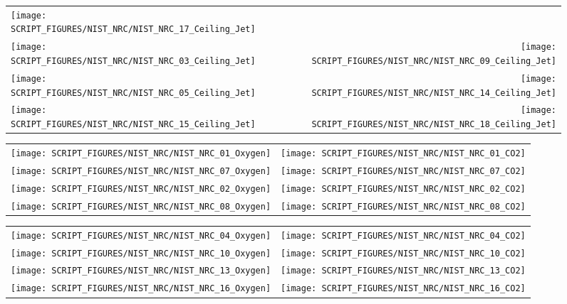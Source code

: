 \begin{figure}[p]
\begin{tabular*}{\textwidth}{l@{\extracolsep{\fill}}r}
\texttt{[image: SCRIPT\_FIGURES/NIST\_NRC/NIST\_NRC\_17\_Ceiling\_Jet]} &
 \\
\texttt{[image: SCRIPT\_FIGURES/NIST\_NRC/NIST\_NRC\_03\_Ceiling\_Jet]} &
\texttt{[image: SCRIPT\_FIGURES/NIST\_NRC/NIST\_NRC\_09\_Ceiling\_Jet]} \\
\texttt{[image: SCRIPT\_FIGURES/NIST\_NRC/NIST\_NRC\_05\_Ceiling\_Jet]} &
\texttt{[image: SCRIPT\_FIGURES/NIST\_NRC/NIST\_NRC\_14\_Ceiling\_Jet]} \\
\texttt{[image: SCRIPT\_FIGURES/NIST\_NRC/NIST\_NRC\_15\_Ceiling\_Jet]} &
\texttt{[image: SCRIPT\_FIGURES/NIST\_NRC/NIST\_NRC\_18\_Ceiling\_Jet]}
\end{tabular*}
\label{NIST_NRC_Jet_Open}
\end{figure}

\clearpage

\begin{figure}[p]
\begin{tabular*}{\textwidth}{l@{\extracolsep{\fill}}r}
\texttt{[image: SCRIPT\_FIGURES/NIST\_NRC/NIST\_NRC\_01\_Oxygen]} &
\texttt{[image: SCRIPT\_FIGURES/NIST\_NRC/NIST\_NRC\_01\_CO2]} \\
\texttt{[image: SCRIPT\_FIGURES/NIST\_NRC/NIST\_NRC\_07\_Oxygen]} &
\texttt{[image: SCRIPT\_FIGURES/NIST\_NRC/NIST\_NRC\_07\_CO2]} \\
\texttt{[image: SCRIPT\_FIGURES/NIST\_NRC/NIST\_NRC\_02\_Oxygen]} &
\texttt{[image: SCRIPT\_FIGURES/NIST\_NRC/NIST\_NRC\_02\_CO2]} \\
\texttt{[image: SCRIPT\_FIGURES/NIST\_NRC/NIST\_NRC\_08\_Oxygen]} &
\texttt{[image: SCRIPT\_FIGURES/NIST\_NRC/NIST\_NRC\_08\_CO2]}
\end{tabular*}
\end{figure}

\begin{figure}[p]
\begin{tabular*}{\textwidth}{l@{\extracolsep{\fill}}r}
\texttt{[image: SCRIPT\_FIGURES/NIST\_NRC/NIST\_NRC\_04\_Oxygen]} &
\texttt{[image: SCRIPT\_FIGURES/NIST\_NRC/NIST\_NRC\_04\_CO2]} \\
\texttt{[image: SCRIPT\_FIGURES/NIST\_NRC/NIST\_NRC\_10\_Oxygen]} &
\texttt{[image: SCRIPT\_FIGURES/NIST\_NRC/NIST\_NRC\_10\_CO2]} \\
\texttt{[image: SCRIPT\_FIGURES/NIST\_NRC/NIST\_NRC\_13\_Oxygen]} &
\texttt{[image: SCRIPT\_FIGURES/NIST\_NRC/NIST\_NRC\_13\_CO2]} \\
\texttt{[image: SCRIPT\_FIGURES/NIST\_NRC/NIST\_NRC\_16\_Oxygen]} &
\texttt{[image: SCRIPT\_FIGURES/NIST\_NRC/NIST\_NRC\_16\_CO2]}
\end{tabular*}\
\end{figure}

